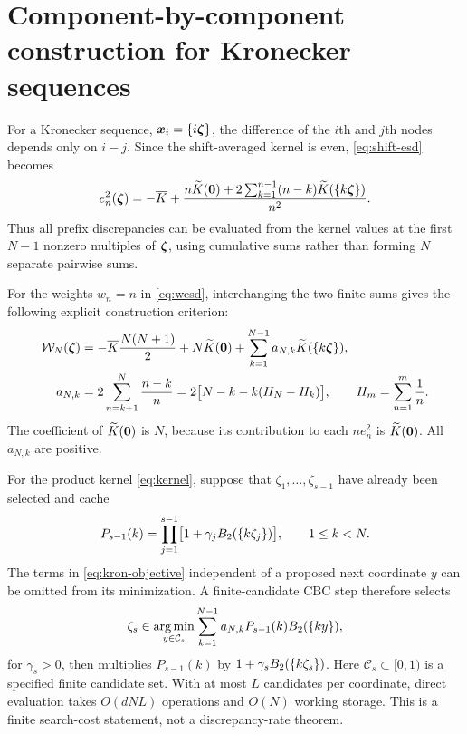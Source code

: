 \section{Component-by-component construction for Kronecker sequences}
\label{sec:kronecker}
For a Kronecker sequence, $\boldsymbol{x}_i=\{i\boldsymbol{\zeta}\}$, the difference of the
$i$th and $j$th nodes depends only on $i-j$. Since the shift-averaged kernel
is even, \eqref{eq:shift-esd} becomes
\begin{equation}\label{eq:kron-esd}
 e_n^2(\boldsymbol{\zeta})=-\overline K+
 \frac{n\widetilde K(\boldsymbol{0})+2\sum_{k=1}^{n-1}(n-k)\widetilde K(\{k\boldsymbol{\zeta}\})}{n^2}.
\end{equation}
Thus all prefix discrepancies can be evaluated from the kernel values at the
first $N-1$ nonzero multiples of $\boldsymbol{\zeta}$, using cumulative sums rather than
forming $N$ separate pairwise sums.

For the weights $w_n=n$ in \eqref{eq:wesd}, interchanging the two finite sums
gives the following explicit construction criterion:
\begin{align}
 \mathcal W_N(\boldsymbol{\zeta})&=-\overline K\frac{N(N+1)}2+N\widetilde K(\boldsymbol{0})
       +\sum_{k=1}^{N-1}a_{N,k}\widetilde K(\{k\boldsymbol{\zeta}\}),\label{eq:kron-objective}\\
 a_{N,k}&=2\sum_{n=k+1}^N\frac{n-k}{n}
       =2\bigl[N-k-k(H_N-H_k)\bigr],\qquad
 H_m=\sum_{n=1}^m\frac1n.\label{eq:kron-coefficients}
\end{align}
The coefficient of $\widetilde K(\boldsymbol{0})$ is $N$, because its contribution to each
$n e_n^2$ is $\widetilde K(\boldsymbol{0})$. All $a_{N,k}$ are positive.

For the product kernel \eqref{eq:kernel}, suppose that $\zeta_1,\ldots,
\zeta_{s-1}$ have already been selected and cache
\[
 P_{s-1}(k)=\prod_{j=1}^{s-1}
       \bigl[1+\gamma_jB_2(\{k\zeta_j\})\bigr],
 \qquad 1\le k<N.
\]
The terms in \eqref{eq:kron-objective} independent of a proposed next
coordinate $y$ can be omitted from its minimization. A finite-candidate CBC
step therefore selects
\begin{equation}\label{eq:kron-cbc}
 \zeta_s\in\operatorname*{arg\,min}_{y\in\mathcal C_s}
 \sum_{k=1}^{N-1}a_{N,k}P_{s-1}(k)B_2(\{ky\}),
\end{equation}
for $\gamma_s>0$, then multiplies $P_{s-1}(k)$ by
$1+\gamma_sB_2(\{k\zeta_s\})$. Here $\mathcal C_s\subset[0,1)$
is a specified finite candidate set. With at most $L$ candidates per
coordinate, direct evaluation takes $O(dNL)$ operations and $O(N)$ working
storage. This is a finite search-cost statement, not a discrepancy-rate theorem.

